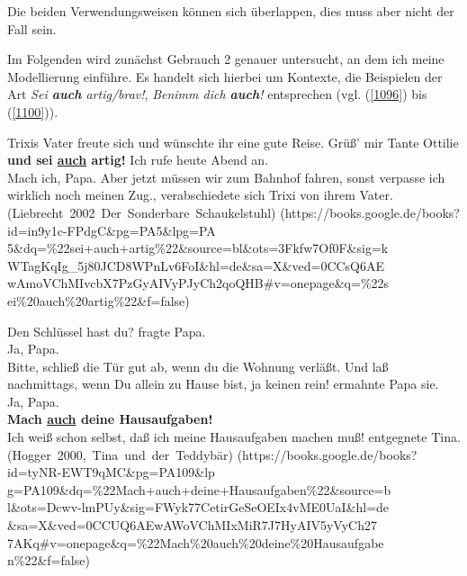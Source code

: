 {Die beiden Verwendungsweisen können sich überlappen, dies muss aber nicht der Fall sein.

Im Folgenden wird zunächst Gebrauch 2 genauer untersucht, an dem ich meine Modellierung einführe. Es handelt sich hierbei um Kontexte, die Beispielen der Art \textit{Sei \textbf{auch} artig/brav!}, \textit{Benimm dich \textbf{auch}!} entsprechen (vgl. (\ref{1096}) bis (\ref{1100})).

\begin{exe}
	\ex\label{1096} 
	\scriptsize
 	Trixis Vater freute sich und wünschte ihr eine gute Reise. \glqq Grüß' mir Tante Ottilie \textbf{und sei \underline{auch} artig!} Ich rufe heute Abend 		an.\grqq{}\\	
	\glqq Mach  ich, Papa. Aber jetzt müssen wir zum Bahnhof fahren, sonst verpasse ich wirklich noch meinen Zug.\grqq{}, verabschiedete sich Trixi von 		ihrem Vater.
	\hfill\hbox{(Liebrecht 2002 Der Sonderbare Schaukelstuhl)}				 
  	\newline
	\hbox{}\hfill\hbox{(https://books.google.de/books?id=in9y1c-FPdgC\&pg=PA5\&lpg=PA}		
   	\newline
	\hbox{}\hfill\hbox{5\&dq=\%22sei+auch+artig\%22\&source=bl\&ots=3Fkfw7Of0F\&sig=k}
	\newline
	\hbox{}\hfill\hbox{WTagKqIg\_5j80JCD8WPnLv6FoI\&hl=de\&sa=X\&ved=0CCsQ6AE}
	\newline
	\hbox{}\hfill\hbox{wAmoVChMIvcbX7PzGyAIVyPJyCh2qoQHB\#v=onepage\&q=\%22s}
	\newline
	\hbox{}\hfill\hbox{ei\%20auch\%20artig\%22\&f=false)}
\end{exe}
	
\begin{exe}
	\ex\label{1097} 
	\scriptsize
 	\glqq Den Schlüssel hast du?\grqq{} fragte Papa.\\
	\glqq Ja, Papa.\grqq{}\\
	\glqq Bitte, schließ die Tür gut ab, wenn du die Wohnung verläßt. Und laß nachmittags, wenn Du allein zu Hause bist, ja keinen rein!\grqq{} ermahnte 		Papa sie.\\
	\glqq Ja, Papa.\grqq{}\\
	\glqq \textbf{Mach \underline{auch} deine Hausaufgaben!}\grqq{}\\
	\glqq Ich weiß schon selbst, daß ich meine Hausaufgaben machen muß!\grqq{} entgegnete Tina.
	\newline
	\hbox{}\hfill\hbox{(Hogger 2000, Tina und der Teddybär)}				 
  	\newline
	\hbox{}\hfill\hbox{(https://books.google.de/books?id=tyNR-EWT9qMC\&pg=PA109\&lp}		
   	\newline
	\hbox{}\hfill\hbox{g=PA109\&dq=\%22Mach+auch+deine+Hausaufgaben\%22\&source=b}
	\newline
	\hbox{}\hfill\hbox{l\&ots=Dcwv-lmPUy\&sig=FWyk77CetirGeSeOEIx4vME0UaI\&hl=de}
	\newline
	\hbox{}\hfill\hbox{\&sa=X\&ved=0CCUQ6AEwAWoVChMIxMiR7J7HyAIV5yVyCh27}
	\newline
	\hbox{}\hfill\hbox{7AKq\#v=onepage\&q=\%22Mach\%20auch\%20deine\%20Hausaufgabe}
	\newline
	\hbox{}\hfill\hbox{n\%22\&f=false)}
\end{exe}						                              
						
}
